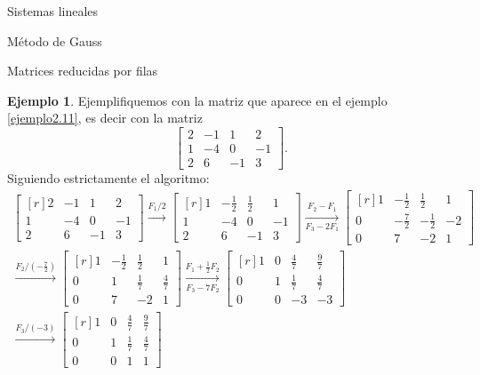 \documentclass[a4paper,12pt,twoside,spanish,reqno]{amsbook}
\theoremstyle{definition}
\newtheorem{ejemplo}{Ejemplo}[section]
\theoremstyle{remark}
\begin{document}
\begin{chapter}{Sistemas lineales}
\begin{section}{Método de Gauss }
\begin{subsection}{Matrices reducidas por filas}
                
                \begin{ejemplo} Ejemplifiquemos con la matriz que aparece en el ejemplo  \ref{ejemplo2.11},  es decir con la matriz
                    $$
                    \begin{bmatrix} 2& -1&1& 2 \\ 1&-4 &0&-1 \\ 2&6&-1&3 \end{bmatrix}.
                    $$
                    Siguiendo estrictamente el algoritmo:
                    \begin{multline*}
                    \begin{bmatrix*}[r] 2& -1&1& 2 \\ 1&-4 &0&-1 \\ 2&6&-1&3 \end{bmatrix*}
                    \stackrel{F_1/2}{\longrightarrow} 
                    \begin{bmatrix*}[r] 1& -\frac12&\frac12& 1 \\ 1&-4 &0&-1 \\ 2&6&-1&3 \end{bmatrix*}
                    \underset{F_3-2F_1}{\stackrel{F_2- F_1}{\longrightarrow}} 
                    \begin{bmatrix*}[r] 1& -\frac12&\frac12& 1 \\ 0&-\frac72 &-\frac12&-2 \\ 0&7&-2&1 \end{bmatrix*}
                    \\
                    \stackrel{F_2/(-\frac72)}{\longrightarrow} 
                    \begin{bmatrix*}[r] 1& -\frac12&\frac12& 1 \\ 0&1 &\frac17&\frac47 \\ 0&7&-2&1 \end{bmatrix*}
                    \underset{F_3-7F_2}{\stackrel{F_1 +\frac12 F_2}{\longrightarrow}} 
                    \begin{bmatrix*}[r] 1& 0&\frac47& \frac97 \\ 0&1 &\frac17&\frac47 \\ 0&0&-3&-3 \end{bmatrix*}
                    \\
                    \stackrel{F_3/(-3)}{\longrightarrow} 
                    \begin{bmatrix*}[r] 1& 0&\frac47& \frac97 \\ 0&1 &\frac17&\frac47 \\ 0&0&1&1 \end{bmatrix*}

\end{multline*}
\end{ejemplo}
\end{subsection}
\end{section}
\end{chapter}
\end{document}
